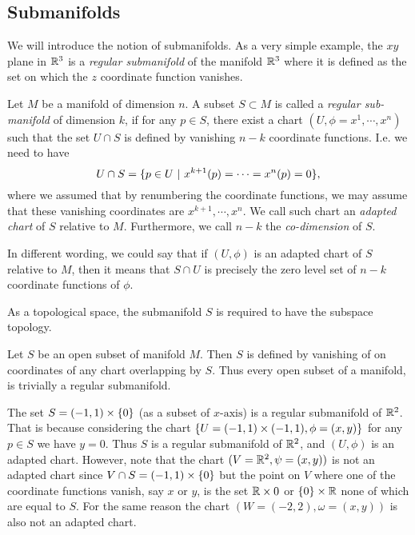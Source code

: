 \subsection{Submanifolds}
We will introduce the notion of submanifolds. As a very simple example, the $ xy $ plane in $ \mathbb{R}^3 $ is a \emph{regular submanifold} of the manifold $ \mathbb{R}^3 $ where it is defined as the set on which the $ z $ coordinate function vanishes. 

\begin{definition}
	Let $ M $ be a manifold of dimension $ n $. A subset $ S \subset M $ is called a \emph{regular sub-manifold} of dimension $ k $, if for any $ p \in S $, there exist a chart $ (U,\phi = x^1,\cdots,x^n) $ such that the set $ U\cap S $ is defined by vanishing $ n-k $ coordinate functions. I.e. we need to have
	\[ U \cap S = \set{p \in U\ |\ x^{k+1}(p)=\cdots=x^n(p) = 0}, \]
	 where we assumed that by renumbering the coordinate functions, we may assume that these vanishing coordinates are $ x^{k+1},\cdots,x^n $. We call such chart an \emph{adapted chart} of $ S $ relative to $ M $. Furthermore, we call $ n-k $ the \emph{co-dimension} of $ S $.
\end{definition}
\begin{remark}
	In different wording, we could say that if $ (U,\phi) $ is an adapted chart of $ S  $ relative to $ M $, then it means that $ S\cap U $ is precisely the zero level set of $ n-k $ coordinate functions of $ \phi $. 
\end{remark}
\begin{remark}
	As a topological space, the submanifold $ S $ is required to have the subspace topology.
\end{remark}

\begin{example}
	Let $ S $ be an open subset of manifold $ M $. Then $ S $ is defined by vanishing of on coordinates of any chart overlapping by $ S $. Thus every open subset of a manifold, is trivially a regular submanifold.
\end{example}

\begin{example}[A submanifold of $ \R^2 $]
	The set $ S = (-1,1) \times \{0\} $ (as a subset of $ x\text{-axis} $) is a regular submanifold of $ \R^2 $. That is because considering the chart $ \{U=(-1,1)\times(-1,1),\phi= (x,y)\} $ for any $ p \in S $ we have $ y = 0 $. Thus $ S $ is a regular submanifold of $ \R^2 $, and $ (U,\phi) $ is an adapted chart. However, note that the chart $ (V = \mathbb{R}^2, \psi=(x,y)) $ is not an adapted chart since $ V \cap S = (-1,1)\times \{0\} $ but the point on $ V $ where one of the coordinate functions vanish, say $ x $ or $ y $, is the set $ \mathbb{R}\times{0} $ or $ \{0\}\times \mathbb{R} $ none of which are equal to $ S $. For the same reason the chart $ (W = (-2,2), \omega=(x,y)) $ is also not an adapted chart.
\end{example}

